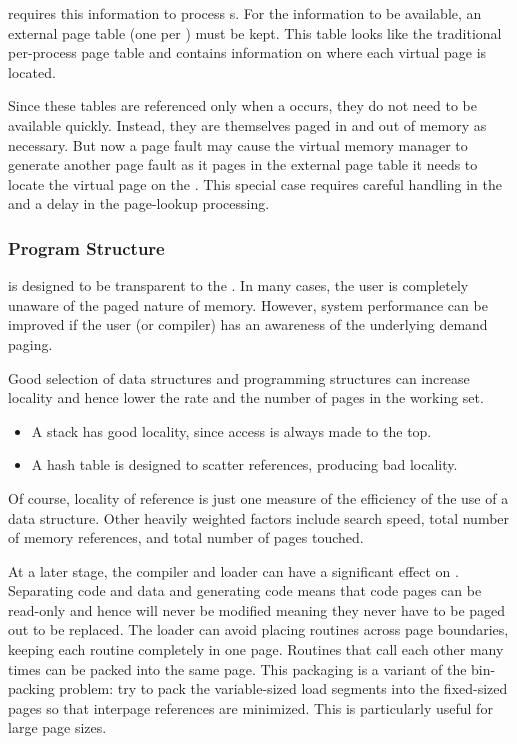  requires this information to process s.
For the information to be available, an external page table (one per ) must be kept.
This table looks like the traditional per-process page table and contains information on where each virtual page is located.

Since these tables are referenced only when a  occurs, they do not need to be available quickly.
Instead, they are themselves paged in and out of memory as necessary.
But now a page fault may cause the virtual memory manager to generate another page fault as it pages in the external page table it needs to locate the virtual page on the .
This special case requires careful handling in the  and a delay in the page-lookup processing.

\subsubsection{Program Structure}\label{subsubsec:Program_Structure}
 is designed to be transparent to the  .
In many cases, the user is completely unaware of the paged nature of memory.
However, system performance can be improved if the user (or compiler) has an awareness of the underlying demand paging.

Good selection of data structures and programming structures can increase locality and hence lower the  rate and the number of pages in the working set.
\begin{itemize}[noitemsep]
\item A stack has good locality, since access is always made to the top.
\item A hash table is designed to scatter references, producing bad locality.
\end{itemize}

Of course, locality of reference is just one measure of the efficiency of the use of a data structure.
Other heavily weighted factors include search speed, total number of memory references, and total number of pages touched.

At a later stage, the compiler and loader can have a significant effect on .
Separating code and data and generating  code means that code pages can be read-only and hence will never be modified meaning they never have to be paged out to be replaced.
The loader can avoid placing routines across page boundaries, keeping each routine completely in one page.
Routines that call each other many times can be packed into the same page.
This packaging is a variant of the bin-packing problem: try to pack the variable-sized load segments into the fixed-sized pages so that interpage references are minimized.
This is particularly useful for large page sizes.

